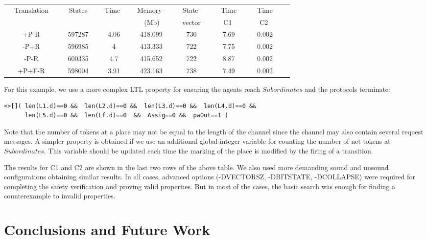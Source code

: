 \documentclass{llncs}
\begin{document}
\vspace{10pt}
\begin{center}\begin{tabular}{|c|c|c|c|c|c|c|c|}
      \hline
      \ \ Translation\ \  &\ \ States\ \ &\ Time\ \ &\ Memory\ \ &\ \ State-\ \ &\ \ Time\ \ &\ \ Time\ \ \\
      \ \  \ \  &\ \  \ \ &\ \ \ &\ \ (Mb) \ &\ vector\ &\ \ C1 \ \ &\ \ C2 \ \ \\
      \hline
      +P-R  & 597287  & 4.06 & 418.099 &  730  &  7.69 & 0.002  \\
      \hline
      -P+R & 596985  & 4 &   413.333 & 722 &   7.75 & 0.002\\
      \hline
      -P-R & 600335  &  4.7 &   415.652 & 722 &   8.87 & 0.002 \\
      \hline
      +P+F-R  & 598004  & 3.91 & 423.163 & 738 & 7.49  & 0.002 \\
      \hline
\end{tabular}\end{center}
\vspace{10pt}


For this example, we use a more complex LTL property for ensuring the agents reach $Subordinates$ and the protocols terminate:
\small
\begin{verbatim}
<>[]( len(L1.d)==0 &&  len(L2.d)==0 &&  len(L3.d)==0 &&  len(L4.d)==0 &&
      len(L5.d)==0 &&  len(Lf.d)==0  &&  Assig==0 &&  pwOut==1 )
\end{verbatim}
\nfont
\noindent Note that the number of tokens at a place may not be equal to the length of the channel since the channel may also contain several request messages. A simpler property is obtained if we use an additional global integer variable for counting the number of net tokens at $Subordinates$. This variable should be updated each time the marking of the place is modified by the firing of a transition.

The results for C1 and C2 are shown in the last two rows of the above table.  We also used more demanding sound and unsound configurations obtaining similar results. In all cases, advanced options (-DVECTORSZ, -DBITSTATE, -DCOLLAPSE) were required for completing the safety verification and proving valid properties. But in most of the cases, the basic search was enough for finding a counterexample to invalid properties.


\section{Conclusions and Future Work}
\label{sec:conclusion}
\end{document}

